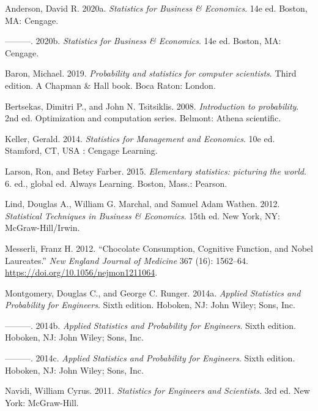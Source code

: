 \documentclass[
  11pt,
  letterpaper,
  DIV=11,
  numbers=noendperiod]{scrreprt}
\newlength{\cslhangindent}
\newenvironment{CSLReferences}[2] %
 {\begin{list}{}{%
  \setlength{\itemindent}{0pt}
  \setlength{\leftmargin}{0pt}
  \setlength{\parsep}{0pt}
  \ifodd #1
   \setlength{\leftmargin}{\cslhangindent}
   \setlength{\itemindent}{-1\cslhangindent}
  \fi
  \setlength{\itemsep}{#2\baselineskip}}}
 {\end{list}}
\begin{document}
\label{refs}
\begin{CSLReferences}{1}{0}
Anderson, David R. 2020a. \emph{Statistics for Business \& Economics}.
14e ed. Boston, MA: Cengage.

---------. 2020b. \emph{Statistics for Business \& Economics}. 14e ed.
Boston, MA: Cengage.

Baron, Michael. 2019. \emph{Probability and statistics for computer
scientists}. Third edition. A Chapman \& Hall book. Boca Raton: London.

Bertsekas, Dimitri P., and John N. Tsitsiklis. 2008. \emph{Introduction
to probability}. 2nd ed. Optimization and computation series. Belmont:
Athena scientific.

Keller, Gerald. 2014. \emph{Statistics for Management and Economics}.
10e ed. Stamford, CT, USA : Cengage Learning.

Larson, Ron, and Betsy Farber. 2015. \emph{Elementary statistics:
picturing the world}. 6. ed., global ed. Always Learning. Boston, Mass.:
Pearson.

Lind, Douglas A., William G. Marchal, and Samuel Adam Wathen. 2012.
\emph{Statistical Techniques in Business \& Economics}. 15th ed. New
York, NY: McGraw-Hill/Irwin.

Messerli, Franz H. 2012. {``Chocolate Consumption, Cognitive Function,
and Nobel Laureates.''} \emph{New England Journal of Medicine} 367 (16):
1562--64. \url{https://doi.org/10.1056/nejmon1211064}.

Montgomery, Douglas C., and George C. Runger. 2014a. \emph{Applied
Statistics and Probability for Engineers}. Sixth edition. Hoboken, NJ:
John Wiley; Sons, Inc.

---------. 2014b. \emph{Applied Statistics and Probability for
Engineers}. Sixth edition. Hoboken, NJ: John Wiley; Sons, Inc.

---------. 2014c. \emph{Applied Statistics and Probability for
Engineers}. Sixth edition. Hoboken, NJ: John Wiley; Sons, Inc.

Navidi, William Cyrus. 2011. \emph{Statistics for Engineers and
Scientists}. 3rd ed. New York: McGraw-Hill.


\end{CSLReferences}
\end{document}
